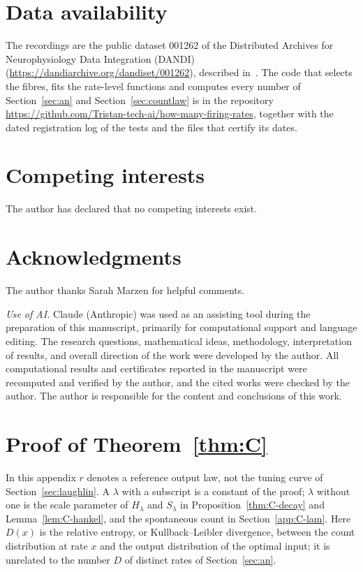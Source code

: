 \documentclass[10pt,letterpaper]{article}
\begin{document}
\section*{Data availability}
The recordings are the public dataset 001262 of the Distributed Archives for Neurophysiology Data Integration (DANDI) (\url{https://dandiarchive.org/dandiset/001262}), described
in~\cite{Heeringa2024}. The code that selects the fibres, fits the rate-level functions and computes every number of
Section~\ref{sec:an} and Section~\ref{sec:countlaw} is in the repository \url{https://github.com/Tristan-tech-ai/how-many-firing-rates},
together with the dated registration log of the tests and the files that certify its dates.

\section*{Competing interests}
The author has declared that no competing interests exist.

\section*{Acknowledgments}
The author thanks Sarah Marzen for helpful comments.

\emph{Use of AI.} Claude (Anthropic) was used as an assisting tool during the preparation of this manuscript, primarily for
computational support and language editing. The research questions, mathematical ideas, methodology, interpretation of results, and
overall direction of the work were developed by the author. All computational results and certificates reported in the manuscript
were recomputed and verified by the author, and the cited works were checked by the author. The author is responsible for the content
and conclusions of this work.

\appendix
\section{Proof of Theorem~\ref{thm:C}}\label{app:C}
In this appendix $r$ denotes a reference output law, not the tuning curve of Section~\ref{sec:laughlin}. A $\lambda$ with a subscript
is a constant of the proof; $\lambda$ without one is the scale parameter of $H_\lambda$ and $S_\lambda$ in Proposition~\ref{thm:C-decay}
and Lemma~\ref{lem:C-hankel}, and the spontaneous count in Section~\ref{app:C-lam}. Here $D(x)$ is the relative entropy, or Kullback--Leibler divergence, between the count distribution at rate $x$ and the output distribution of the optimal input; it is unrelated to the number $D$ of distinct rates of Section~\ref{sec:an}.
\end{document}
